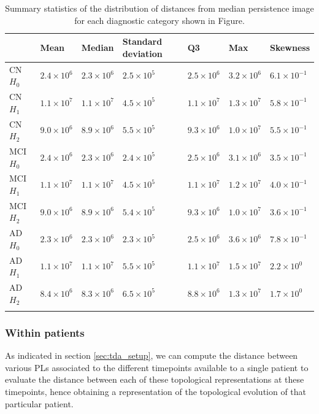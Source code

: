\documentclass{article}
\begin{document}
\begin{table}
\centering
\begin{tabular}{lllllll}
\toprule
{} &               Mean &             Median & Standard deviation & Q3 &                Max &            Skewness \\
\midrule
CN $H_0$  &  $2.4\times10^{6}$ &  $2.3\times10^{6}$ & $2.5\times10^{5}$ &  $2.5\times10^{6}$ &  $3.2\times10^{6}$ & $6.1\times10^{-1}$ \\
CN $H_1$  &  $1.1\times10^{7}$ &  $1.1\times10^{7}$ & $4.5\times10^{5}$ &  $1.1\times10^{7}$ &  $1.3\times10^{7}$ & $5.8\times10^{-1}$ \\
CN $H_2$  &  $9.0\times10^{6}$ &  $8.9\times10^{6}$ & $5.5\times10^{5}$ &  $9.3\times10^{6}$ &  $1.0\times10^{7}$ & $5.5\times10^{-1}$ \\
MCI $H_0$ &  $2.4\times10^{6}$ &  $2.3\times10^{6}$ & $2.4\times10^{5}$ &  $2.5\times10^{6}$ &  $3.1\times10^{6}$ & $3.5\times10^{-1}$ \\
MCI $H_1$ &  $1.1\times10^{7}$ &  $1.1\times10^{7}$ & $4.5\times10^{5}$ &  $1.1\times10^{7}$ &  $1.2\times10^{7}$ & $4.0\times10^{-1}$ \\
MCI $H_2$ &  $9.0\times10^{6}$ &  $8.9\times10^{6}$ & $5.4\times10^{5}$ &  $9.3\times10^{6}$ &  $1.0\times10^{7}$ & $3.6\times10^{-1}$ \\
AD $H_0$  &  $2.3\times10^{6}$ &  $2.3\times10^{6}$ & $2.3\times10^{5}$ &  $2.5\times10^{6}$ &  $3.6\times10^{6}$ & $7.8\times10^{-1}$ \\
AD $H_1$  &  $1.1\times10^{7}$ &  $1.1\times10^{7}$ & $5.5\times10^{5}$ &  $1.1\times10^{7}$ &  $1.5\times10^{7}$ & $2.2\times10^{0}$ \\
AD $H_2$  &  $8.4\times10^{6}$ &  $8.3\times10^{6}$ & $6.5\times10^{5}$ &  $8.8\times10^{6}$ &  $1.3\times10^{7}$ & $1.7\times10^{0}$ \\
  \bottomrule
  \vspace{1pt}
\end{tabular}
\caption{Summary statistics of the distribution of distances from median persistence image for each diagnostic category shown in Figure.}
\label{tab:stats_median_pi}
\end{table}



\subsubsection{Within patients}

As indicated in section \ref{sec:tda_setup}, we can compute the distance between various PLs associated to the different timepoints available to a single patient to evaluate the distance between each of these topological representations at these timepoints, hence obtaining a representation of the topological evolution of that particular patient.
\end{document}
